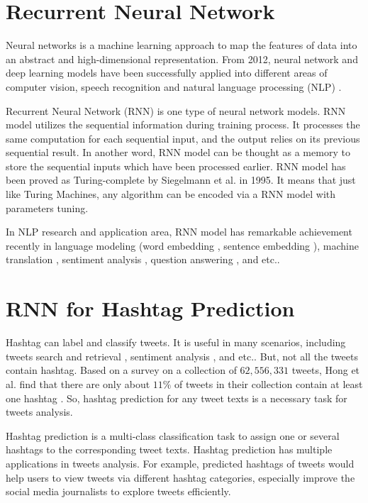 \section{Recurrent Neural Network}
Neural networks is a machine learning approach to map the features of data into an abstract and high-dimensional representation. From 2012, neural network and deep learning models have been successfully applied into different areas of computer vision, speech recognition and natural language processing (NLP) \cite{LeCun2015}. 

Recurrent Neural Network (RNN) is one type of neural network models. RNN model utilizes the sequential information during training process. It processes the same computation for each sequential input, and the output relies on its previous sequential result. In another word, RNN model can be thought as a memory to store the sequential inputs which have been processed earlier.  RNN model has been proved as Turing-complete by Siegelmann et al.\cite{Siegelmann1995} in 1995. It means that just like Turing Machines, any algorithm can be encoded via a RNN model with parameters tuning. 

In NLP research and application area, RNN model has remarkable achievement recently in language modeling (word embedding \cite{Mikolov2013}, sentence embedding \cite{Kiros2015}), machine translation \cite{Sutskever2014}, sentiment analysis \cite{Socher2013}, question answering \cite{Iyyer2014}, and etc.. 

\section{RNN for Hashtag Prediction}

Hashtag can label and classify tweets. It is useful in many scenarios, including tweets search and retrieval \cite{Efron2010}, sentiment analysis \cite{Davidov2010}, and etc.. But, not all the tweets contain hashtag. Based on a survey on a collection of $62,556,331$ tweets, Hong et al. find that there are only about $11\%$ of tweets in their collection contain at least one hashtag \cite{Hong2011a}. So, hashtag prediction for any tweet texts is a necessary task for tweets analysis. 

Hashtag prediction is a multi-class classification task to assign one or several hashtags to the corresponding tweet texts. Hashtag prediction has multiple applications in tweets analysis.  For example, predicted hashtags of tweets would help users to view tweets via different hashtag categories, especially improve the social media journalists to explore tweets efficiently. 

